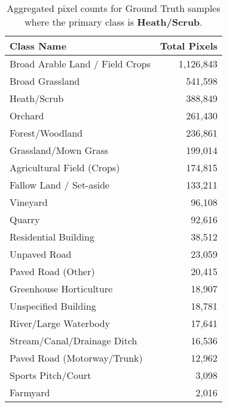 \begin{table}[H] %
    \centering
    \caption{Aggregated pixel counts for Ground Truth samples where the primary class is \textbf{Heath/Scrub}.}
    \label{tab:gt_counts_12}
    \begin{tabular}{lr}
        \hline
        \textbf{Class Name} & \textbf{Total Pixels} \\
        \hline
        Broad Arable Land / Field Crops & 1,126,843 \\
        Broad Grassland & 541,598 \\
        Heath/Scrub & 388,849 \\
        Orchard & 261,430 \\
        Forest/Woodland & 236,861 \\
        Grassland/Mown Grass & 199,014 \\
        Agricultural Field (Crops) & 174,815 \\
        Fallow Land / Set-aside & 133,211 \\
        Vineyard & 96,108 \\
        Quarry & 92,616 \\
        Residential Building & 38,512 \\
        Unpaved Road & 23,059 \\
        Paved Road (Other) & 20,415 \\
        Greenhouse Horticulture & 18,907 \\
        Unspecified Building & 18,781 \\
        River/Large Waterbody & 17,641 \\
        Stream/Canal/Drainage Ditch & 16,536 \\
        Paved Road (Motorway/Trunk) & 12,962 \\
        Sports Pitch/Court & 3,098 \\
        Farmyard & 2,016 \\
        \hline
    \end{tabular}
\end{table}

